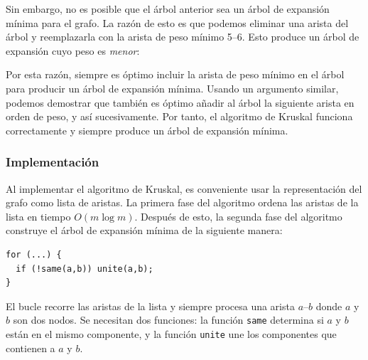 Sin embargo, no es posible que el árbol anterior
sea un árbol de expansión mínima para el grafo.
La razón de esto es que podemos eliminar una arista
del árbol y reemplazarla con la arista de peso mínimo 5--6.
Esto produce un árbol de expansión cuyo peso es
\emph{menor}:

\begin{center}
\end{center}

Por esta razón, siempre es óptimo
incluir la arista de peso mínimo
en el árbol para producir un árbol de expansión mínima.
Usando un argumento similar, podemos demostrar que también
es óptimo añadir al árbol la siguiente arista en orden de peso,
y así sucesivamente.
Por tanto, el algoritmo de Kruskal funciona correctamente y
siempre produce un árbol de expansión mínima.

\subsubsection{Implementación}

Al implementar el algoritmo de Kruskal,
es conveniente usar
la representación del grafo como lista de aristas.
La primera fase del algoritmo ordena las
aristas de la lista en tiempo $O(m \log m)$.
Después de esto, la segunda fase del algoritmo
construye el árbol de expansión mínima de la siguiente manera:

\begin{lstlisting}
for (...) {
  if (!same(a,b)) unite(a,b);
}
\end{lstlisting}

El bucle recorre las aristas de la lista
y siempre procesa una arista $a$--$b$
donde $a$ y $b$ son dos nodos.
Se necesitan dos funciones:
la función \texttt{same} determina
si $a$ y $b$ están en el mismo componente,
y la función \texttt{unite}
une los componentes que contienen a $a$ y $b$.

